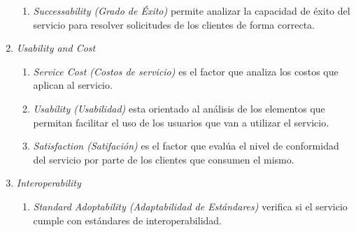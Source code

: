 \begin{enumerate}
\begin{enumerate}
	\item \emph{Successability (Grado de Éxito)} permite analizar la capacidad de éxito del servicio para resolver solicitudes de los clientes de forma correcta.
	\end{enumerate}
\item \emph{Usability and Cost}
	\begin{enumerate} 
	\item \emph{Service Cost (Costos de servicio)} es el factor que analiza los costos que aplican al servicio.
	\item \emph{Usability (Usabilidad)} esta orientado al análisis de los elementos que permitan facilitar el uso de los usuarios que van a utilizar el servicio.
	\item \emph{Satisfaction (Satifación)} es el factor que evalúa el nivel de conformidad del servicio por parte de los clientes que consumen el mismo.
	\end{enumerate}
\item \emph{Interoperability}
	\begin{enumerate}
	\item \emph{Standard Adoptability (Adaptabilidad de Estándares)} verifica si el servicio cumple con estándares de interoperabilidad.
	\end{enumerate}
\end{enumerate}

